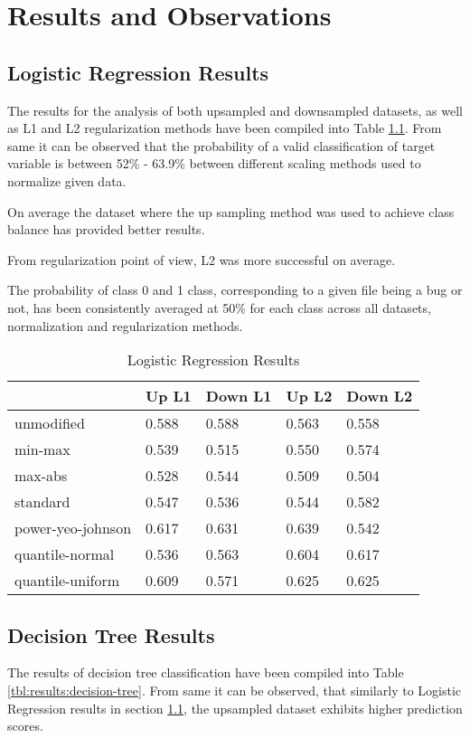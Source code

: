 \chapter{Results and Observations}\label{chp:results-and-observations}
\section{Logistic Regression Results}\label{sec:results:log-reg}
The results for the analysis of both upsampled and downsampled datasets, as well as L1 and L2 regularization methods have been compiled into Table \ref{tbl:results:log-reg}. From same it can be observed that the probability of a valid classification of \isBug{} target variable is between 52\% - 63.9\% between different scaling methods used to normalize given data.

On average the dataset where the up sampling method was used to achieve class balance has provided better results. 

From regularization point of view, L2 was more successful on average.

The probability of class 0 and 1 class, corresponding to a given file being a bug or not, has been consistently averaged at 50\% for each class across all datasets, normalization and regularization methods. 
\begin{table}[h!]
\centering
\caption{Logistic Regression Results}
\label{tbl:results:log-reg}
\begin{tabular}{@{}lllll@{}}
\toprule
 & Up L1 & Down L1 & Up L2 & Down L2 \\ \midrule
unmodified & 0.588 & 0.588 & 0.563 & 0.558 \\
min-max & 0.539 & 0.515 & 0.550 & 0.574 \\
max-abs & 0.528 & 0.544 & 0.509 & 0.504 \\
standard & 0.547 & 0.536 & 0.544 & 0.582 \\
power-yeo-johnson & 0.617 & 0.631 & 0.639 & 0.542 \\
quantile-normal & 0.536 & 0.563 & 0.604 & 0.617 \\
quantile-uniform & 0.609 & 0.571 & 0.625 & 0.625 \\ \bottomrule
\end{tabular}
\end{table}

\section{Decision Tree Results}\label{sec:results:decision-tree}
The results of decision tree classification have been compiled into Table \ref{tbl:results:decision-tree}. From same it can be observed, that similarly to Logistic Regression results in section \ref{sec:results:log-reg}, the upsampled dataset exhibits higher prediction scores. 

